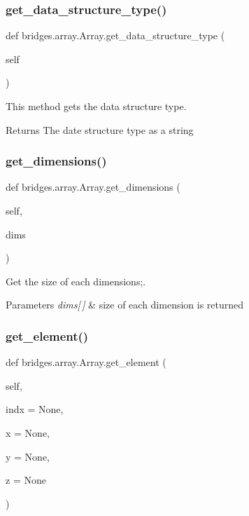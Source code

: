 \subsubsection{\texorpdfstring{get\+\_\+data\+\_\+structure\+\_\+type()}{get\_data\_structure\_type()}}
{\footnotesize\ttfamily def bridges.\+array.\+Array.\+get\+\_\+data\+\_\+structure\+\_\+type (\begin{DoxyParamCaption}\item[{}]{self }\end{DoxyParamCaption})}



This method gets the data structure type. 

\begin{DoxyReturn}{Returns}
The date structure type as a string 
\end{DoxyReturn}
\mbox{\label{classbridges_1_1array_1_1_array_a25d42635a6bd5e8a5a6de6973b5a33a7}} 
\subsubsection{\texorpdfstring{get\+\_\+dimensions()}{get\_dimensions()}}
{\footnotesize\ttfamily def bridges.\+array.\+Array.\+get\+\_\+dimensions (\begin{DoxyParamCaption}\item[{}]{self,  }\item[{}]{dims }\end{DoxyParamCaption})}



Get the size of each dimensions;. 


\begin{DoxyParams}{Parameters}
{\em dims\mbox{[}$\,$\mbox{]}} & size of each dimension is returned \\
\hline
\end{DoxyParams}
\mbox{\label{classbridges_1_1array_1_1_array_a08753128cf55630f266bbbb0951617ba}} 
\subsubsection{\texorpdfstring{get\+\_\+element()}{get\_element()}}
{\footnotesize\ttfamily def bridges.\+array.\+Array.\+get\+\_\+element (\begin{DoxyParamCaption}\item[{}]{self,  }\item[{}]{indx = {\ttfamily None},  }\item[{}]{x = {\ttfamily None},  }\item[{}]{y = {\ttfamily None},  }\item[{}]{z = {\ttfamily None} }\end{DoxyParamCaption})}

